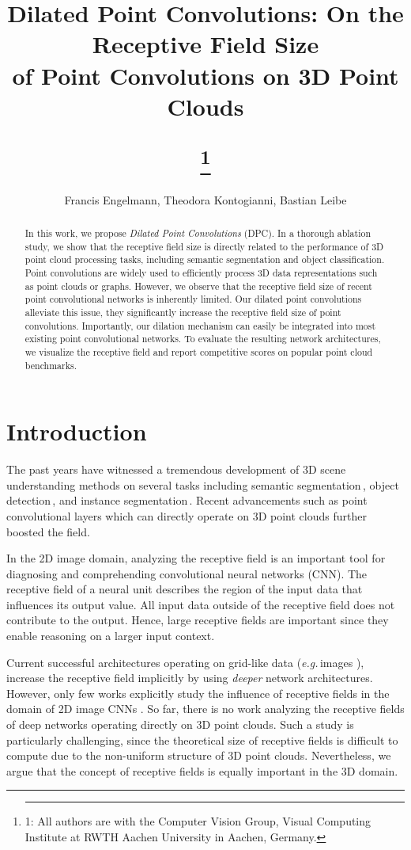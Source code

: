 \documentclass[letterpaper, 10 pt, conference]{ieeeconf}
\title{\LARGE {\bf Dilated Point Convolutions:} On the Receptive Field Size \\of Point Convolutions on 3D Point Clouds
\author{Francis Engelmann, Theodora Kontogianni, Bastian Leibe}\thanks{\vspace{-15pt} \hrule \vspace{3pt}1: All authors are with the Computer Vision Group, Visual Computing Institute at RWTH Aachen University in Aachen, Germany.
}}
\def\eg{\emph{e.g.}\,}
\begin{document}
\maketitle
\thispagestyle{empty}
\pagestyle{empty}

\begin{abstract}
In this work, we propose \emph{Dilated Point Convolutions} (DPC).
In a thorough ablation study, we show that the receptive field size is directly related to the performance of 3D point cloud processing tasks,
including semantic segmentation and object classification. 
Point convolutions are widely used to efficiently process 3D data representations such as point clouds or graphs.
However, we observe that the receptive field size of recent point convolutional networks is inherently limited.
Our dilated point convolutions alleviate this issue, they significantly increase the receptive field size of point convolutions.
Importantly, our dilation mechanism can easily be integrated into most existing point convolutional networks.
To evaluate the resulting network architectures, we visualize the receptive field and report competitive scores on popular point cloud benchmarks.
\end{abstract} 


\section{Introduction}
\label{sec:intro}
The past years have witnessed a tremendous development of 3D scene understanding methods on several tasks
including semantic segmentation\,\cite{Qi17CVPR}, object detection\,\cite{Zhou18CVPR}, and instance segmentation\,\cite{Elich19GCPR}.
Recent advancements such as point convolutional layers \cite{Wang18CVPRa, Wang18CoRR, Wu18CVPR} which can directly operate on 3D point clouds further boosted the field.

In the 2D image domain, analyzing the receptive field is an important tool for diagnosing and comprehending convolutional neural networks (CNN).
The receptive field of a neural unit describes the region of the input data that influences its output value.
All input data outside of the receptive field does not contribute to the output.
Hence, large receptive fields are important since they enable reasoning on a larger input context.

Current successful architectures operating on grid-like data (\eg images \cite{Simonyan15ICLR, Szegedy15CVPR, He16CVPR}), increase the receptive field implicitly by using \emph{deeper} network architectures.
However, only few works explicitly study the influence of receptive fields in the domain of 2D image CNNs \cite{Luo16NIPS, Mishkin17CVIU}.
So far, there is no work analyzing the receptive fields of deep networks operating directly on 3D point clouds.
Such a study is particularly challenging, since the theoretical size of receptive fields is difficult to compute due to the non-uniform structure of 3D point clouds.
Nevertheless, we argue that the concept of receptive fields is equally important in the 3D domain.
\end{document}
